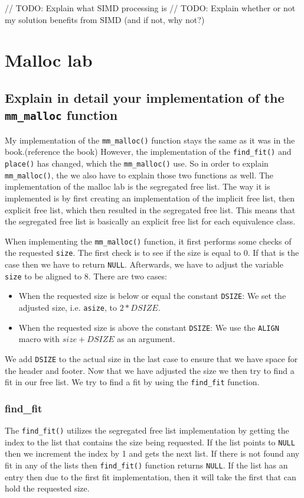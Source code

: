\documentclass[11pt]{article}
\newcommand{\code}[1]{{\colorbox{lightgray!15}{\color{orange}\texttt{#1}}}}
\newcommand{\temp}[1]{{\color{red}#1}}
\begin{document}
// TODO: Explain what SIMD processing is
// TODO: Explain whether or not my solution benefits from SIMD (and if not, why not?)
\section{Malloc lab}
\subsection{Explain in detail your implementation of the \code{mm\_malloc} function}

My implementation of the \code{mm\_malloc()} function stays the same as it was in the book.\temp{(reference the book)}
However, the implementation of the \code{find\_fit()} and \code{place()} has changed, which the \code{mm\_malloc()} use. So in order to explain \code{mm\_malloc()},
the we also have to explain those two functions as well.
The implementation of the malloc lab is the segregated free list. 
The way it is implemented is by first creating an implementation of the implicit free list, then explicit free list, 
which then resulted in the segregated free list.
This means that the segregated free list is basically an explicit free list for each equivalence class.

When implementing the \code{mm\_malloc()} function, it first performs some checks of the requested \code{size}. The first check is to see if the size is equal to 0. If that is the case then we have to return \code{NULL}.
Afterwards, we have to adjust the variable \code{size} to be aligned to 8. There are two cases:
\begin{itemize}
    \item When the requested size is below or equal the constant \code{DSIZE}: We set the adjusted size, i.e. \code{asize}, to $2 * DSIZE$.
    \item When the requested size is above the constant \code{DSIZE}: We use the \code{ALIGN} macro with $size + DSIZE$ as an argument.
\end{itemize}

We add \code{DSIZE} to the actual size in the last case to ensure that we have space for the header and footer.
Now that we have adjusted the size we then try to find a fit in our free list. 
We try to find a fit by using the \code{find\_fit} function.

\subsubsection{find\_fit}
The \code{find\_fit()} utilizes the segregated free list implementation by getting the index to the list that contains the size being requested. 
If the list points to \code{NULL} then we increment the index by 1 and gets the next list. 
If there is not found any fit in any of the lists then \code{find\_fit()} function returns \code{NULL}.
If the list has an entry then due to the first fit implementation, then it will take the first that can hold the requested size.
\end{document}
